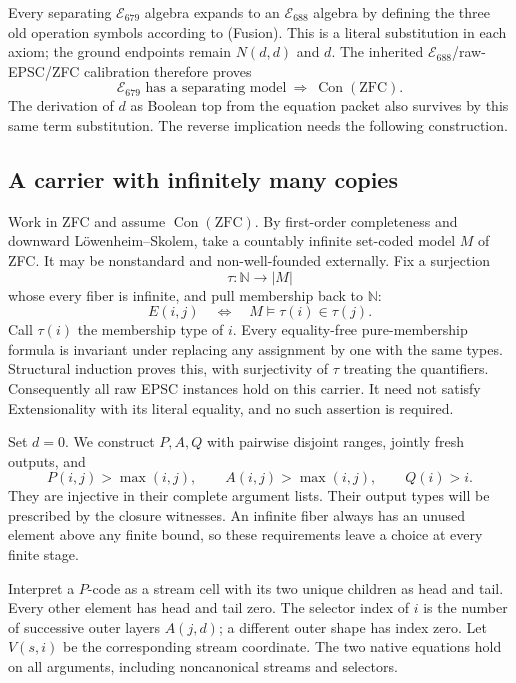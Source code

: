 Every separating $\mathcal E_{679}$ algebra expands to an
$\mathcal E_{688}$ algebra by defining the three old operation symbols
according to (Fusion).  This is a literal substitution in each axiom;
the ground endpoints remain $N(d,d)$ and $d$.  The inherited
$\mathcal E_{688}$/raw-EPSC/ZFC calibration therefore proves
\[
 \mathcal E_{679}\text{ has a separating model}
       \ \Longrightarrow\ \operatorname{Con}(\mathrm{ZFC}).
\]
The derivation of $d$ as Boolean top from the equation packet also
survives by this same term substitution.  The reverse implication needs
the following construction.

\subsection*{A carrier with infinitely many copies}

Work in ZFC and assume $\operatorname{Con}(\mathrm{ZFC})$.  By first-order
completeness and downward L\"owenheim--Skolem, take a countably infinite
set-coded model $M$ of ZFC.  It may be nonstandard and non-well-founded
externally.  Fix a surjection
\[
             \tau:\mathbb N\longrightarrow |M|
\]
whose every fiber is infinite, and pull membership back to $\mathbb N$:
\[
          E(i,j)\quad\Longleftrightarrow\quad
                        M\models\tau(i)\in\tau(j).
\]
Call $\tau(i)$ the membership type of $i$.  Every equality-free
pure-membership formula is invariant under replacing any assignment by
one with the same types.  Structural induction proves this, with
surjectivity of $\tau$ treating the quantifiers.  Consequently all raw
EPSC instances hold on this carrier.  It need not satisfy Extensionality
with its literal equality, and no such assertion is required.

Set $d=0$.  We construct $P,A,Q$ with pairwise disjoint ranges, jointly
fresh outputs, and
\[
       P(i,j)>\max(i,j),\qquad A(i,j)>\max(i,j),\qquad Q(i)>i.
\]
They are injective in their complete argument lists.  Their output types
will be prescribed by the closure witnesses.  An infinite fiber always
has an unused element above any finite bound, so these requirements
leave a choice at every finite stage.

Interpret a $P$-code as a stream cell with its two unique children as
head and tail.  Every other element has head and tail zero.  The selector
index of $i$ is the number of successive outer layers $A(j,d)$; a
different outer shape has index zero.  Let $V(s,i)$ be the corresponding
stream coordinate.  The two native equations hold on all arguments,
including noncanonical streams and selectors.

